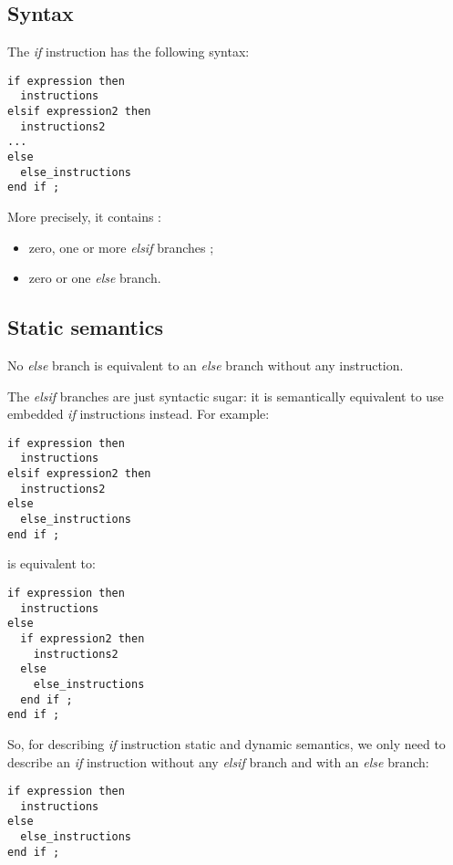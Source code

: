 \subsection{Syntax}

The \emph{if} instruction has the following syntax:
{
\begin{lstlisting}[language=galgas]
if expression then
  instructions
elsif expression2 then
  instructions2
...
else
  else_instructions
end if ;  
\end{lstlisting}
}

More precisely, it contains :
\begin{itemize}
\item zero, one or more \emph{elsif} branches ;
\item zero or one \emph{else} branch.
\end{itemize}


\subsection{Static semantics}


No \emph{else} branch is equivalent to an \emph{else} branch without any instruction.


The \emph{elsif} branches are just syntactic sugar: it is semantically equivalent to use embedded \emph{if} instructions instead. For example:
{
\begin{lstlisting}[language=galgas]
if expression then
  instructions
elsif expression2 then
  instructions2
else
  else_instructions
end if ;  
\end{lstlisting}
}
is equivalent to:
{
\begin{lstlisting}[language=galgas]
if expression then
  instructions
else
  if expression2 then
    instructions2
  else
    else_instructions
  end if ;  
end if ;  
\end{lstlisting}
}

So, for describing \emph{if} instruction static and dynamic semantics, we only need to describe an \emph{if} instruction without any \emph{elsif} branch and with an \emph{else} branch:
{
\begin{lstlisting}[language=galgas]
if expression then
  instructions
else
  else_instructions
end if ;
\end{lstlisting}
}

